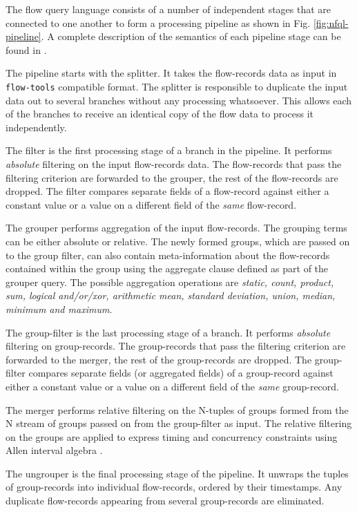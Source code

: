 The flow query language consists of a number of independent stages that are
connected to one another to form a processing pipeline as shown in Fig.
\ref{fig:nfql-pipeline}. A complete description of the semantics of each
pipeline stage can be found in \cite{vmarinov:2009}.

The pipeline starts with the splitter. It takes the flow-records data as input
in \texttt{flow-tools} compatible format. The splitter is responsible to
duplicate the input data out to several branches without any processing
whatsoever. This allows each of the branches to receive an identical copy of
the flow data to process it independently.

The filter is the first processing stage of a branch in the pipeline.  It
performs \emph{absolute} filtering on the input flow-records data.  The
flow-records that pass the filtering criterion are forwarded to the grouper,
the rest of the flow-records are dropped. The filter compares separate fields
of a flow-record against either a constant value or a value on a different
field of the \emph{same} flow-record.

The grouper performs aggregation of the input flow-records. The grouping
terms can be either absolute or relative. The newly formed groups, which are
passed on to the group filter, can also contain meta-information about the
flow-records contained within the group using the aggregate clause defined as
part of the grouper query. The possible aggregation operations are
\emph{static, count, product, sum, logical and/or/xor, arithmetic mean,
standard deviation, union, median, minimum and maximum}.

The group-filter is the last processing stage of a branch. It performs
\emph{absolute} filtering on group-records. The group-records
that pass the filtering criterion are forwarded to the merger, the rest of the
group-records are dropped. The group-filter compares separate fields (or
aggregated fields) of a group-record against either a constant value or a value
on a different field of the \emph{same} group-record.

The merger performs relative filtering on the N-tuples of groups formed from
the N stream of groups passed on from the group-filter as input. The relative
filtering on the groups are applied to express timing and concurrency
constraints using Allen interval algebra \cite{fallen:1983}.

The ungrouper is the final processing stage of the pipeline. It unwraps the
tuples of group-records into individual flow-records, ordered by their
timestamps. Any duplicate flow-records appearing from several group-records
are eliminated.
